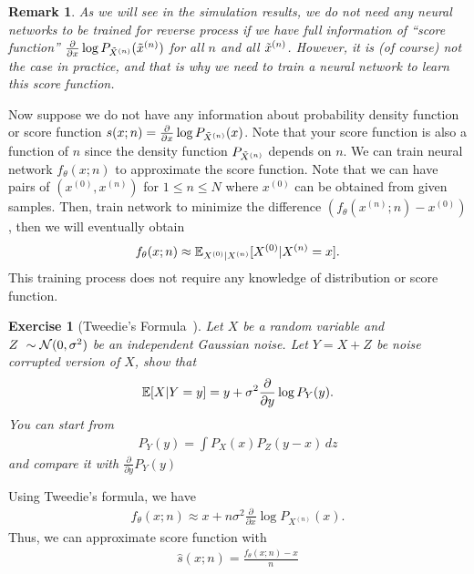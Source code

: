 \documentclass[11pt]{article}
\newtheorem{exercise}{Exercise}
\newtheorem{remark}{Remark}
\begin{document}
\begin{remark}
    As we will see in the simulation results, we do not need any neural networks to be trained for reverse process
    if we have full information of ``score function'' $\frac{\partial}{\partial x} \log P_{\tilde{X}^{(n)}} (\tilde{x}^{(n)})$ for all $n$ and all $\tilde{x}^{(n)}$.
    However, it is (of course) not the case in practice, and that is why we need to train a neural network to learn this score function.
\end{remark}

Now suppose we do not have any information about probability density function or score function $s(x; n) = \frac{\partial}{\partial x} \log P_{\tilde{X}^{(n)}} (x)$.
Note that your score function is also a function of $n$ since the density function $P_{\tilde{X}^{(n)}}$ depends on $n$.
We can train neural network $f_{\theta}(x; n)$ to approximate the score function.
Note that we can have pairs of $(x^{(0)}, x^{(n)})$ for $1\leq n\leq N$ where $x^{(0)}$ can be obtained from given samples.
Then, train network to minimize the difference $(f_{\theta}(x^{(n)};n) - x^{(0)})$, then we will eventually obtain
\begin{align}
    f_{\theta}(x;n) \approx \mathbb{E}_{X^{(0)}|X^{(n)}} [X^{(0)}| X^{(n)}=x].
\end{align}
This training process does not require any knowledge of distribution or score function.

\begin{exercise}[Tweedie's Formula~\cite{efron2011tweedie}]
    Let $X$ be a random variable and $Z~\sim{\cal N}(0, \sigma^2)$ be an independent Gaussian noise.
    Let $Y= X+Z$ be noise corrupted version of $X$, show that
    \begin{align}
        \mathbb{E}[X|Y=y]  = y + \sigma^2 \frac{\partial}{\partial y} \log P_{Y}(y).
    \end{align}
    You can start from 
    \begin{align}
        P_Y(y) = \int P_X(x) P_Z(y-x)\, dz 
    \end{align}
    and compare it with $\frac{\partial}{\partial y} P_Y(y)$
\end{exercise}

Using Tweedie's formula, we have
\begin{align}
    f_{\theta}(x;n) \approx x + n\sigma^2 \frac{\partial}{\partial x} \log P_{X^{(n)}}(x).
\end{align}
Thus, we can approximate score function with
\begin{align}
    \hat{s}(x;n) = \frac{f_{\theta}(x; n) - x}{n}
\end{align}
\end{document}
